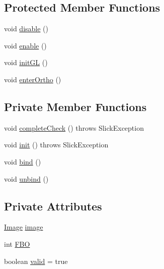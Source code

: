 \subsection*{Protected Member Functions}
\begin{DoxyCompactItemize}
\item 
void \mbox{\hyperlink{classorg_1_1newdawn_1_1slick_1_1opengl_1_1pbuffer_1_1_f_b_o_graphics_a87102f973ae4d5038c3ddfe5fdd668c7}{disable}} ()
\item 
void \mbox{\hyperlink{classorg_1_1newdawn_1_1slick_1_1opengl_1_1pbuffer_1_1_f_b_o_graphics_a55575a64fc9c6fe2b955ad0a631ee767}{enable}} ()
\item 
void \mbox{\hyperlink{classorg_1_1newdawn_1_1slick_1_1opengl_1_1pbuffer_1_1_f_b_o_graphics_a90fe529215a03036496bfa22dc27546d}{init\+GL}} ()
\item 
void \mbox{\hyperlink{classorg_1_1newdawn_1_1slick_1_1opengl_1_1pbuffer_1_1_f_b_o_graphics_a68aa1165ae60456ee23cefee575e38d2}{enter\+Ortho}} ()
\end{DoxyCompactItemize}
\subsection*{Private Member Functions}
\begin{DoxyCompactItemize}
\item 
void \mbox{\hyperlink{classorg_1_1newdawn_1_1slick_1_1opengl_1_1pbuffer_1_1_f_b_o_graphics_a6ce997c28b1b5d958103057135340507}{complete\+Check}} ()  throws Slick\+Exception 
\item 
void \mbox{\hyperlink{classorg_1_1newdawn_1_1slick_1_1opengl_1_1pbuffer_1_1_f_b_o_graphics_a7ddf1bb9199f2c1e45ff29e5604904b7}{init}} ()  throws Slick\+Exception 
\item 
void \mbox{\hyperlink{classorg_1_1newdawn_1_1slick_1_1opengl_1_1pbuffer_1_1_f_b_o_graphics_afb781a7fc3cb297e55a94440653a1bb3}{bind}} ()
\item 
void \mbox{\hyperlink{classorg_1_1newdawn_1_1slick_1_1opengl_1_1pbuffer_1_1_f_b_o_graphics_a97b6e81e29ca7188a71d8a029d07befe}{unbind}} ()
\end{DoxyCompactItemize}
\subsection*{Private Attributes}
\begin{DoxyCompactItemize}
\item 
\mbox{\hyperlink{classorg_1_1newdawn_1_1slick_1_1_image}{Image}} \mbox{\hyperlink{classorg_1_1newdawn_1_1slick_1_1opengl_1_1pbuffer_1_1_f_b_o_graphics_a7c88e67ddd520ec76bdc0082285ae909}{image}}
\item 
int \mbox{\hyperlink{classorg_1_1newdawn_1_1slick_1_1opengl_1_1pbuffer_1_1_f_b_o_graphics_a94baa0295ca9f8d804b98c49be9abc8a}{F\+BO}}
\item 
boolean \mbox{\hyperlink{classorg_1_1newdawn_1_1slick_1_1opengl_1_1pbuffer_1_1_f_b_o_graphics_a75f5500bcba77517cbb586456bab19a6}{valid}} = true
\end{DoxyCompactItemize}
